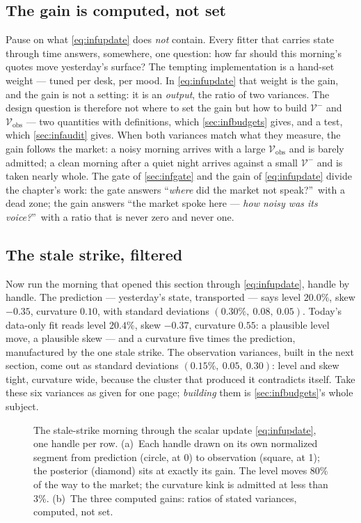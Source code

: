 \subsection{The gain is computed, not set}

Pause on what \cref{eq:infupdate} does \emph{not} contain.  Every
fitter that carries state through time answers, somewhere, one
question: how far should this morning's quotes move yesterday's
surface?  The tempting implementation is a hand-set weight ---
tuned per desk, per mood.  In \cref{eq:infupdate} that weight is
the gain, and the gain is not a setting: it is an \emph{output},
the ratio of two variances.  The design question is therefore not
where to set the gain but how to build $\mathcal{V}^{-}$ and
$\mathcal{V}_{\mathrm{obs}}$ --- two quantities with definitions,
which \cref{sec:infbudgets} gives, and a test, which
\cref{sec:infaudit} gives.  When both variances match what they
measure, the gain follows the market: a noisy morning arrives with
a large $\mathcal{V}_{\mathrm{obs}}$ and is barely admitted; a
clean morning after a quiet night arrives against a small
$\mathcal{V}^{-}$ and is taken nearly whole.  The gate of
\cref{sec:infgate} and the gain of \cref{eq:infupdate} divide the
chapter's work: the gate answers ``\emph{where} did the market not
speak?''\ with a dead zone; the gain answers ``the market spoke
here --- \emph{how noisy was its voice?}''\ with a ratio that is
never zero and never one.

\subsection{The stale strike, filtered}

Now run the morning that opened this section through
\cref{eq:infupdate}, handle by handle.  The prediction ---
yesterday's state, transported --- says level $20.0\%$, skew
$-0.35$, curvature $0.10$, with standard deviations
$(0.30\%,\ 0.08,\ 0.05)$.  Today's data-only fit reads level
$20.4\%$, skew $-0.37$, curvature $0.55$: a plausible level move, a
plausible skew --- and a curvature five times the prediction,
manufactured by the one stale strike.  The observation variances,
built in the next section, come out as standard
deviations $(0.15\%,\ 0.05,\ 0.30)$: level and skew tight, curvature
wide, because the cluster that produced it contradicts itself.  Take
these six variances as given for one page; \emph{building} them is
\cref{sec:infbudgets}'s whole subject.

\begin{figure}[htbp]
\centering
{}
\caption{The stale-strike morning through the scalar update
\cref{eq:infupdate}, one handle per row.  (a)~Each handle drawn on
its own normalized segment from prediction (circle, at 0) to
observation (square, at 1); the posterior (diamond) sits at exactly
its gain.  The level moves 80\% of the way to the market; the
curvature kink is admitted at less than 3\%.  (b)~The three computed
gains: ratios of stated variances, computed, not set.}
\label{fig:infupdate}
\end{figure}

